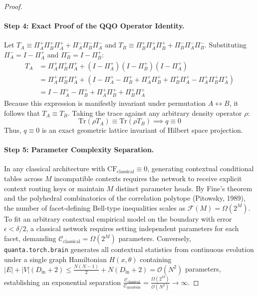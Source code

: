\documentclass[10pt,twocolumn,3p]{article}
\begin{document}
\begin{proof}
\paragraph{Step 4: Exact Proof of the QQO Operator Identity.}
Let $T_A \equiv \Pi_A^+ \Pi_B^+ \Pi_A^+ + \Pi_A^- \Pi_B^- \Pi_A^-$ and $T_B \equiv \Pi_B^+ \Pi_A^+ \Pi_B^+ + \Pi_B^- \Pi_A^- \Pi_B^-$. Substituting $\Pi_A^- = I - \Pi_A^+$ and $\Pi_B^- = I - \Pi_B^+$:
\begin{align}
    T_A &= \Pi_A^+ \Pi_B^+ \Pi_A^+ + (I - \Pi_A^+)(I - \Pi_B^+)(I - \Pi_A^+) \nonumber \\
        &= \Pi_A^+ \Pi_B^+ \Pi_A^+ + \left( I - \Pi_A^+ - \Pi_B^+ + \Pi_A^+ \Pi_B^+ + \Pi_B^+ \Pi_A^+ - \Pi_A^+ \Pi_B^+ \Pi_A^+ \right) \nonumber \\
        &= I - \Pi_A^+ - \Pi_B^+ + \Pi_A^+ \Pi_B^+ + \Pi_B^+ \Pi_A^+
\end{align}
Because this expression is manifestly invariant under permutation $A \leftrightarrow B$, it follows that $T_A \equiv T_B$. Taking the trace against any arbitrary density operator $\rho$:
\begin{equation}
    \text{Tr}(\rho T_A) \equiv \text{Tr}(\rho T_B) \implies q \equiv 0
\end{equation}
Thus, $q \equiv 0$ is an exact geometric lattice invariant of Hilbert space projection.

\paragraph{Step 5: Parameter Complexity Separation.}
In any classical architecture with $\text{CF}_{\text{classical}} \equiv 0$, generating contextual conditional tables across $M$ incompatible contexts requires the network to receive explicit context routing keys or maintain $M$ distinct parameter heads. By Fine's theorem and the polyhedral combinatorics of the correlation polytope (Pitowsky, 1989), the number of facet-defining Bell-type inequalities scales as $\mathcal{F}(M) = \Omega(2^M)$. To fit an arbitrary contextual empirical model on the boundary with error $\epsilon < \delta / 2$, a classical network requires setting independent parameters for each facet, demanding $\mathcal{C}_{\text{classical}} = \Omega(2^M)$ parameters. Conversely, \texttt{quanta.torch.brain} generates all contextual statistics from continuous evolution under a single graph Hamiltonian $H(x, \theta)$ containing $|E| + |V|(D_{\text{in}} + 2) \le \frac{N(N-1)}{2} + N(D_{\text{in}} + 2) = \mathcal{O}(N^2)$ parameters, establishing an exponential separation $\frac{\mathcal{C}_{\text{classical}}}{\mathcal{C}_{\text{quantum}}} = \frac{\Omega(2^M)}{\mathcal{O}(N^2)} \to \infty$.
\end{proof}
\end{document}
